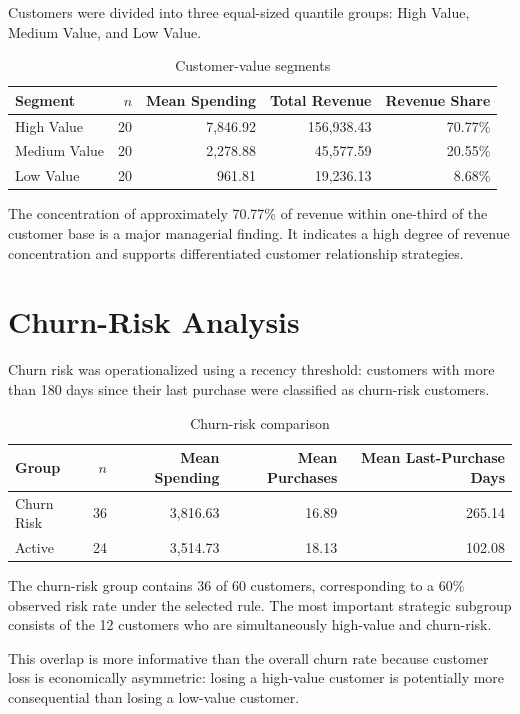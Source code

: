 \documentclass[11pt,a4paper]{article}
\begin{document}
Customers were divided into three equal-sized quantile groups:
High Value, Medium Value, and Low Value.

\begin{table}[H]
\centering
\caption{Customer-value segments}
\label{tab:value}
\begin{tabular}{lrrrr}
\toprule
Segment & $n$ & Mean Spending & Total Revenue & Revenue Share \\
\midrule
High Value & 20 & 7,846.92 & 156,938.43 & 70.77\% \\
Medium Value & 20 & 2,278.88 & 45,577.59 & 20.55\% \\
Low Value & 20 & 961.81 & 19,236.13 & 8.68\% \\
\bottomrule
\end{tabular}
\end{table}

The concentration of approximately 70.77\% of revenue within one-third
of the customer base is a major managerial finding. It indicates a
high degree of revenue concentration and supports differentiated
customer relationship strategies.

\section{Churn-Risk Analysis}

Churn risk was operationalized using a recency threshold: customers with
more than 180 days since their last purchase were classified as
churn-risk customers.

\begin{table}[H]
\centering
\caption{Churn-risk comparison}
\label{tab:churn}
\begin{tabular}{lrrrr}
\toprule
Group & $n$ & Mean Spending & Mean Purchases & Mean Last-Purchase Days \\
\midrule
Churn Risk & 36 & 3,816.63 & 16.89 & 265.14 \\
Active & 24 & 3,514.73 & 18.13 & 102.08 \\
\bottomrule
\end{tabular}
\end{table}

The churn-risk group contains 36 of 60 customers, corresponding to a
60\% observed risk rate under the selected rule. The most important
strategic subgroup consists of the 12 customers who are simultaneously
high-value and churn-risk.

This overlap is more informative than the overall churn rate because
customer loss is economically asymmetric: losing a high-value customer
is potentially more consequential than losing a low-value customer.
\end{document}
